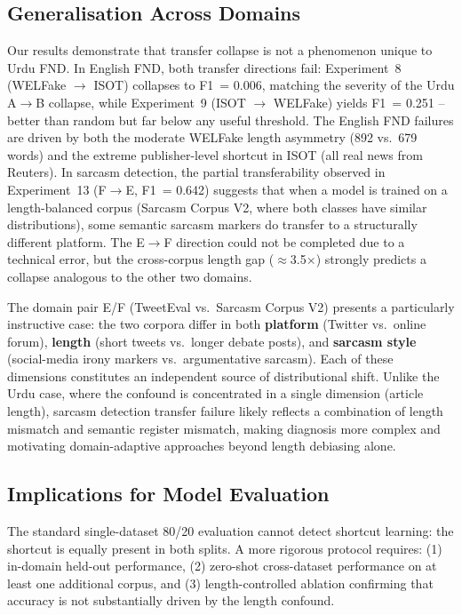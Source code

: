 \documentclass[conference]{IEEEtran}
\begin{document}
\subsection{Generalisation Across Domains}

Our results demonstrate that transfer collapse is not a phenomenon
unique to Urdu FND. In English FND, both transfer directions fail:
Experiment~8 (WELFake $\to$ ISOT) collapses to F1~= 0.006,
matching the severity of the Urdu A$\to$B collapse, while
Experiment~9 (ISOT $\to$ WELFake) yields F1~= 0.251 -- better than
random but far below any useful threshold. The English FND failures
are driven by both the moderate WELFake length asymmetry
(892 vs.\ 679 words) and the extreme publisher-level shortcut in ISOT
(all real news from Reuters). In sarcasm detection, the partial
transferability observed in Experiment~13 (F$\to$E, F1~= 0.642)
suggests that when a model is trained on a length-balanced corpus
(Sarcasm Corpus V2, where both classes have similar distributions),
some semantic sarcasm markers do transfer to a structurally different
platform. The E$\to$F direction could not be completed due to a
technical error, but the cross-corpus length gap ($\approx$3.5$\times$)
strongly predicts a collapse analogous to the other two domains.

The domain pair E/F (TweetEval vs.\ Sarcasm Corpus V2) presents a
particularly instructive case: the two corpora differ in both
\textbf{platform} (Twitter vs.\ online forum), \textbf{length}
(short tweets vs.\ longer debate posts), and \textbf{sarcasm style}
(social-media irony markers vs.\ argumentative sarcasm). Each of
these dimensions constitutes an independent source of distributional
shift. Unlike the Urdu case, where the confound is concentrated in a
single dimension (article length), sarcasm detection transfer failure
likely reflects a combination of length mismatch and semantic register
mismatch, making diagnosis more complex and motivating domain-adaptive
approaches beyond length debiasing alone.

\subsection{Implications for Model Evaluation}

The standard single-dataset 80/20 evaluation cannot detect shortcut
learning: the shortcut is equally present in both splits. A more
rigorous protocol requires: (1) in-domain held-out performance,
(2) zero-shot cross-dataset performance on at least one additional
corpus, and (3) length-controlled ablation confirming that accuracy
is not substantially driven by the length confound.
\end{document}
